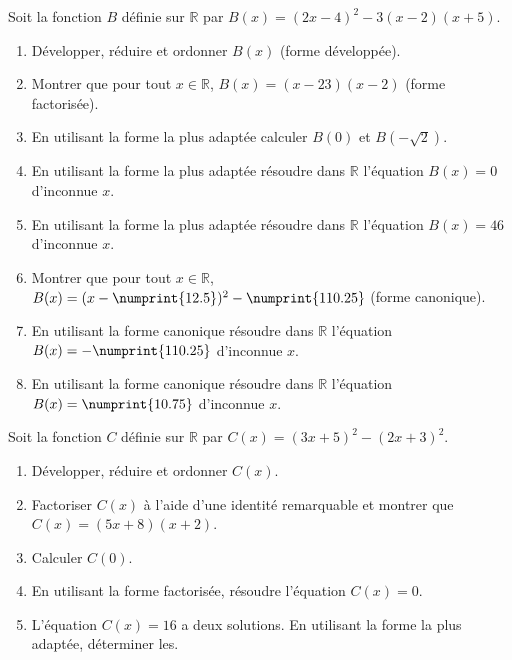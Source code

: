 \documentclass[main.tex]{subfiles}
\begin{document}
\begin{exercise}[rebelotte] Soit la fonction $B$ définie sur $\mathbb{R}$ par    $B(x) =(2x-4)^2-3(x-2)(x+5)$.
\begin{enumerate}[label=\arabic*), leftmargin=*]
\item Développer, réduire et ordonner $B(x)$ (forme développée). 
\item Montrer que pour tout $x\in\mathbb{R}$,  $B(x)=(x-23)(x-2)$ (forme factorisée).
\item En utilisant la forme la plus adaptée calculer $B(0)$ et $B(-\sqrt{2})$.  
\item En utilisant la forme la plus adaptée résoudre dans $\mathbb{R}$ l'équation $B(x)=0$ d'inconnue $x$.  
\item En utilisant la forme la plus adaptée résoudre dans $\mathbb{R}$ l'équation $B(x)=46$ d'inconnue $x$.  
\item Montrer que pour tout $x\in\mathbb{R}$, $B(x)=(x-\numprint{12.5})^2- \numprint{110.25}$ (forme canonique).
\item En utilisant la forme canonique résoudre dans $\mathbb{R}$ l'équation $B(x)=- \numprint{110.25}$ d'inconnue $x$. 
\item En utilisant la forme canonique résoudre dans $\mathbb{R}$ l'équation $B(x)=\numprint{10.75}$ d'inconnue $x$. 
\end{enumerate}
\end{exercise}

\begin{exercise}[un dernier]Soit la fonction $C$ définie sur $\mathbb{R}$ par $C(x) =(3x+5)^2-(2x+3)^2$.
\begin{enumerate}[label=\arabic*), leftmargin=*]
\item Développer, réduire et ordonner $C(x)$. 
\item Factoriser $C(x)$ à l'aide d'une identité remarquable et montrer que $C(x)=(5x+8)(x+2)$.
\item Calculer $C(0)$.
\item En utilisant la forme factorisée, résoudre l'équation $C(x)=0$.
\item L'équation  $C(x)=16$ a deux solutions. En utilisant la forme la plus adaptée, déterminer les.
\end{enumerate}
\end{exercise}
\end{document}

